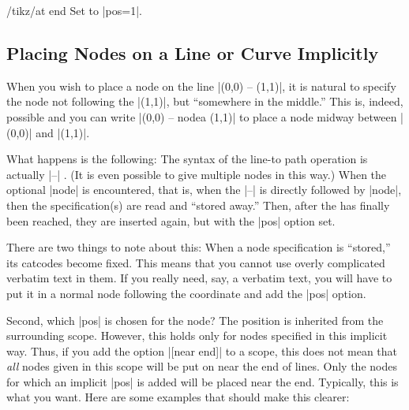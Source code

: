 \begin{stylekey}{/tikz/at end}
  Set to |pos=1|.
\end{stylekey}


\subsection{Placing Nodes on a Line or Curve Implicitly}

\label{section-nodes-placing-2}

When you wish to place a node on the line |(0,0) -- (1,1)|,
it is natural to specify the node not following the |(1,1)|, but
``somewhere in the middle.'' This is, indeed, possible and you can
write |(0,0) -- node{a} (1,1)| to place a node midway between |(0,0)| and
|(1,1)|.

What happens is the following: The syntax of the line-to path
operation is actually |--|
. (It is even
possible to give multiple nodes in this way.) When the optional
|node| is encountered, that is,
when the |--| is directly followed by |node|, then the
specification(s) are read and ``stored away.'' Then, after the
 has finally been reached, they are inserted again,
but with the |pos| option set.

There are two things to note about this: When a node specification is
``stored,'' its catcodes become fixed. This means that you cannot use
overly complicated verbatim text in them. If you really need, say, a
verbatim text, you will have to put it in a normal node following the
coordinate and add the |pos| option.

Second, which |pos| is chosen for the node? The position is inherited
from the surrounding scope. However, this holds only for nodes
specified in this implicit way. Thus, if you add the option
|[near end]| to a scope, this does not mean that \emph{all} nodes given
in this scope will be put on near the end of lines. Only the nodes
for which an implicit |pos| is added will be placed near the
end. Typically, this is what you want. Here are some examples that
should make this clearer:

\begin{codeexample}[]
\end{codeexample}

